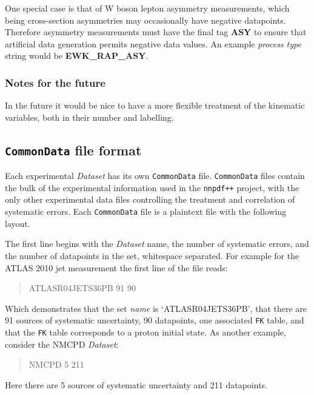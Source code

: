 \documentclass[11pt]{article}
\begin{document}
One special case is that of W boson lepton asymmetry measurements, which being cross-section asymmetries may occasionally have negative datapoints. Therefore asymmetry measurements must have the final tag \textbf{ASY} to ensure that artificial data generation permits negative data values. An example \emph{process type} string would be \textbf{EWK\_RAP\_ASY}.

\subsubsection*{Notes for the future}
In the future it would be nice to have a more flexible treatment of the kinematic variables, both in their number and labelling.


\subsection{{\tt CommonData} file format}
Each experimental \emph{Dataset} has its own {\tt CommonData} file. {\tt CommonData} files contain the bulk of the experimental information used in the {\tt nnpdf++} project, with the only other experimental data files controlling the treatment and correlation of systematic errors. Each {\tt CommonData} file is a plaintext file with the following layout.

The first line begins with the \emph{Dataset} name, the number of systematic errors, and the number of datapoints in the set, whitespace separated.
For example for the ATLAS 2010 jet measurement the first line of the file reads:
\begin{quotation}\noindent
ATLASR04JETS36PB        91      90
\end{quotation}
Which demonstrates that the set \emph{name} is `ATLASR04JETS36PB', that there are 91 sources of systematic uncertainty, 90 datapoints, one associated {\tt FK} table, and that the {\tt FK} table corresponds to a proton initial state. As another example, consider the NMCPD \emph{Dataset}:
\begin{quotation}\noindent
NMCPD   5       211
\end{quotation}
Here there are 5 sources of systematic uncertainty and 211 datapoints.
\end{document}
